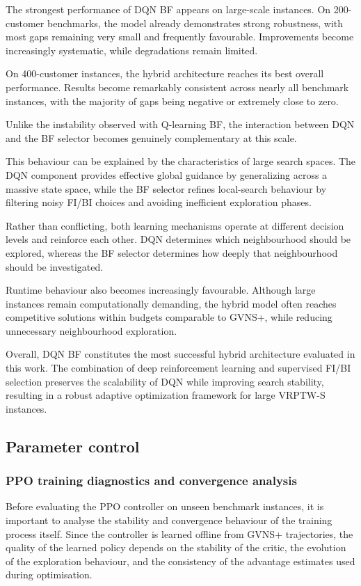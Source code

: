 The strongest performance of DQN BF appears on large-scale instances. On 200-customer benchmarks, the model already demonstrates strong robustness, with most gaps remaining very small and frequently favourable. Improvements become increasingly systematic, while degradations remain limited.

On 400-customer instances, the hybrid architecture reaches its best overall performance. Results become remarkably consistent across nearly all benchmark instances, with the majority of gaps being negative or extremely close to zero.

Unlike the instability observed with Q-learning BF, the interaction between DQN and the BF selector becomes genuinely complementary at this scale.

This behaviour can be explained by the characteristics of large search spaces. The DQN component provides effective global guidance by generalizing across a massive state space, while the BF selector refines local-search behaviour by filtering noisy FI/BI choices and avoiding inefficient exploration phases.

Rather than conflicting, both learning mechanisms operate at different decision levels and reinforce each other. DQN determines which neighbourhood should be explored, whereas the BF selector determines how deeply that neighbourhood should be investigated.

Runtime behaviour also becomes increasingly favourable. Although large instances remain computationally demanding, the hybrid model often reaches competitive solutions within budgets comparable to GVNS+, while reducing unnecessary neighbourhood exploration.

Overall, DQN BF constitutes the most successful hybrid architecture evaluated in this work. The combination of deep reinforcement learning and supervised FI/BI selection preserves the scalability of DQN while improving search stability, resulting in a robust adaptive optimization framework for large VRPTW-S instances.

\subsection{Parameter control}

\subsubsection{PPO training diagnostics and convergence analysis}
Before evaluating the PPO controller on unseen benchmark instances, it is important to analyse the stability and convergence behaviour of the training process itself. Since the controller is learned offline from GVNS+ trajectories, the quality of the learned policy depends on the stability of the critic, the evolution of the exploration behaviour, and the consistency of the advantage estimates used during optimisation.

